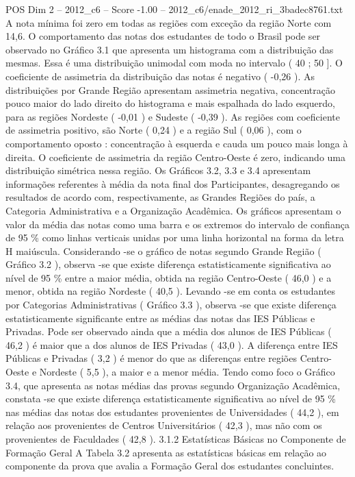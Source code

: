 \begin{textsample}{POS Dim 2 – 2012\_c6 – Score -1.00 – 2012\_c6/enade\_2012\_ri\_3badec8761.txt}
A nota mínima foi zero em todas as regiões com exceção da região Norte com 14,6.
O comportamento das notas dos estudantes de todo o Brasil pode ser observado no Gráfico 3.1 que apresenta um histograma com a distribuição das mesmas.
Essa é uma distribuição unimodal com moda no intervalo ( 40 ; 50 ].
O coeficiente de assimetria da distribuição das notas é negativo ( -0,26 ).
As distribuições por Grande Região apresentam assimetria negativa, concentração pouco maior do lado direito do histograma e mais espalhada do lado esquerdo, para as regiões Nordeste ( -0,01 ) e Sudeste ( -0,39 ).
As regiões com coeficiente de assimetria positivo, são Norte ( 0,24 ) e a região Sul ( 0,06 ), com o comportamento oposto : concentração à esquerda e cauda um pouco mais longa à direita.
O coeficiente de assimetria da região Centro-Oeste é zero, indicando uma distribuição simétrica nessa região.
Os Gráficos 3.2, 3.3 e 3.4 apresentam informações referentes à média da nota final dos Participantes, desagregando os resultados de acordo com, respectivamente, as Grandes Regiões do país, a Categoria Administrativa e a Organização Acadêmica.
Os gráficos apresentam o valor da média das notas como uma barra e os extremos do intervalo de confiança de 95 \% como linhas verticais unidas por uma linha horizontal na forma da letra H maiúscula.
Considerando -se o gráfico de notas segundo Grande Região ( Gráfico 3.2 ), observa -se que existe diferença estatisticamente significativa ao nível de 95 \% entre a maior média, obtida na região Centro-Oeste ( 46,0 ) e a menor, obtida na região Nordeste ( 40,5 ).
Levando -se em conta os estudantes por Categorias Administrativas ( Gráfico 3.3 ), observa -se que existe diferença estatisticamente significante entre as médias das notas das IES Públicas e Privadas.
Pode ser observado ainda que a média dos alunos de IES Públicas ( 46,2 ) é maior que a dos alunos de IES Privadas ( 43,0 ).
A diferença entre IES Públicas e Privadas ( 3,2 ) é menor do que as diferenças entre regiões Centro-Oeste e Nordeste ( 5,5 ), a maior e a menor média.
Tendo como foco o Gráfico 3.4, que apresenta as notas médias das provas segundo Organização Acadêmica, constata -se que existe diferença estatisticamente significativa ao nível de 95 \% nas médias das notas dos estudantes provenientes de Universidades ( 44,2 ), em relação aos provenientes de Centros Universitários ( 42,3 ), mas não com os provenientes de Faculdades ( 42,8 ). 3.1.2 Estatísticas Básicas no Componente de Formação Geral A Tabela 3.2 apresenta as estatísticas básicas em relação ao componente da prova que avalia a Formação Geral dos estudantes concluintes.

\end{textsample}
